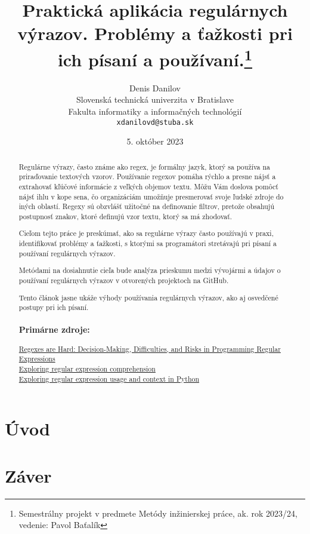 \documentclass[10pt,twoside,slovak,a4paper]{article}
\title{Praktická aplikácia regulárnych výrazov. Problémy a ťažkosti pri ich písaní a používaní.\thanks{Semestrálny projekt v predmete Metódy inžinierskej práce, ak. rok 2023/24, vedenie: Pavol Baťalík}} %
\author{Denis Danilov\\[2pt]
	{\small Slovenská technická univerzita v Bratislave}\\
	{\small Fakulta informatiky a informačných technológií}\\
	{\small \texttt{xdanilovd@stuba.sk}}
	}
\date{\small 5. október 2023} %
\begin{document}
\maketitle

\begin{abstract}
	Regulárne výrazy, často známe ako regex, je formálny jazyk, ktorý sa používa na priraďovanie textových vzorov. Používanie regexov pomáha rýchlo a presne nájsť a extrahovať kľúčové informácie z veľkých objemov textu. Môžu Vám doslova pomôcť nájsť ihlu v kope sena, čo organizáciám umožňuje presmerovať svoje ľudské zdroje do iných oblastí. Regexy sú obzvlášť užitočné na definovanie filtrov, pretože obsahujú postupnosť znakov, ktoré definujú vzor textu, ktorý sa má zhodovať.
	
	Cieľom tejto práce je preskúmať, ako sa regulárne výrazy často používajú v praxi, identifikovať problémy a ťažkosti, s ktorými sa programátori stretávajú pri písaní a používaní regulárnych výrazov.
	
	Metódami na dosiahnutie cieľa bude analýza prieskumu medzi vývojármi a údajov o používaní regulárnych výrazov v otvorených projektoch na GitHub.
	
	Tento článok jasne ukáže výhody používania regulárnych výrazov, ako aj osvedčené postupy pri ich písaní.

	\subsubsection*{Primárne zdroje:}
		\href{https://ieeexplore.ieee.org/document/8952499}{Regexes are Hard: Decision-Making, Difficulties, and Risks in Programming Regular Expressions}\\
		\href{https://ieeexplore.ieee.org/abstract/document/8115653?casa_token=0zEYgNnCaVQAAAAA:cBdJp6DGDTaTLUHm74gkpohFRAJcZIcy5S4S6PO5ZNQ8hLK-fA2J9dZPLceXZPakzifsjgu-6qYeYQ}{Exploring regular expression comprehension}\\
		\href{https://dl.acm.org/doi/10.1145/2931037.2931073}{Exploring regular expression usage and context in Python}
\end{abstract}



\section{Úvod}



\section{Záver} \label{zaver} %






\end{document}
